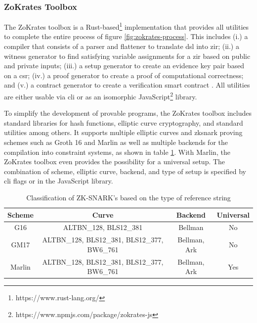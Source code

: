 
\subsubsection{ZoKrates Toolbox}
\label{subsubsec:toolbox}

The ZoKrates toolbox is a Rust-based\footnote{https://www.rust-lang.org/} implementation that provides all utilities to complete the entire process of figure \ref{fig:zokrates-process}. This includes (i.) a compiler that consists of a parser and flattener to translate \acrshort{dsl} into \acrshort{zir}; (ii.) a witness generator to find satisfying variable assignments for a \acrshort{zir} based on public and private inputs; (iii.) a setup generator to create an evidence key pair based on a \acrshort{csr}; (iv.) a proof generator to create a proof of computational correctness; and (v.) a contract generator to create a verification smart contract \cite{eberhardtZoKratesScalablePrivacyPreserving2018a}. All utilities are either usable via \acrfull{cli} or as an isomorphic JavaScript\footnote{https://www.npmjs.com/package/zokrates-js} library.

To simplify the development of provable programs, the ZoKrates toolbox includes standard libraries for hash functions, elliptic curve cryptography, and standard utilities among others. It supports multiple elliptic curves and \acrshort{zksnark} proving schemes such as Groth 16 and Marlin as well as multiple backends for the compilation into constraint systems, as shown in table \ref{tab:zokrates-backend}. With Marlin, the ZoKrates toolbox even provides the possibility for a universal setup. The combination of scheme, elliptic curve, backend, and type of setup is specified by \acrshort{cli} flags or in the JavaScript library.

\begin{table}[H]
  \small
  \centering
    \begin{tabular}{cccc}
    \toprule
    \textbf{Scheme} & \textbf{Curve} & \textbf{Backend} & \textbf{Universal} \\
    \midrule
    G16 \cite{grothSizePairingBasedNoninteractive2016} & ALTBN\_128, BLS12\_381 & Bellman & No \\
    GM17 \cite{grothSnarkySignaturesMinimal2017} & ALTBN\_128, BLS12\_381, BLS12\_377, BW6\_761 & Bellman, Ark & No \\
    Marlin \cite{chiesaMarlinPreprocessingZkSNARKs2020} & ALTBN\_128, BLS12\_381, BLS12\_377, BW6\_761 & Bellman, Ark & Yes \\
    \bottomrule
    \end{tabular}%
  \caption{Classification of ZK-SNARK's based on the type of reference string}
  \label{tab:zokrates-backend}%
\end{table}%